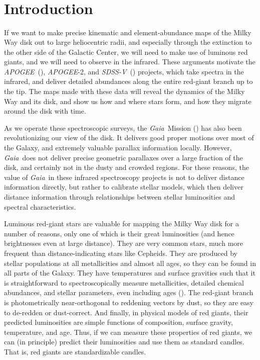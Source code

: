 \documentclass[modern]{aastex62}
\newcommand{\acronym}[1]{{\small{#1}}}
\newcommand{\project}[1]{\textsl{#1}}
\newcommand{\apogee}{\project{\acronym{APOGEE}}}
\newcommand{\gaia}{\project{Gaia}}
\newcommand{\sdssv}{\project{\acronym{SDSS-V}}}
\begin{document}

\section*{~}\clearpage
\section{Introduction} \label{sec:intro}

If we want to make precise kinematic and element-abundance maps
of the Milky Way disk out to large heliocentric radii,
and especially through the extinction to the other side of the Galactic Center, we will
need to make use of luminous red giants, and we will need to observe in
the infrared.
These arguments motivate the \apogee\ (\citealt{apogee}),
\apogee-2, and \sdssv\ (\citealt{sdssv})
projects, which take spectra in the infrared, and deliver detailed abundances
along the entire red-giant branch up to the tip.
The maps made with these data will reveal the dynamics of the Milky Way and its disk,
and show us how and where stars form, and how they migrate around the
disk with time.

As we operate these spectroscopic surveys,
the \gaia\ Mission (\citealt{gaia}) has also been revolutionizing our view of the disk.
It delivers good proper motions over most of the Galaxy,
and extremely valuable parallax information locally.
However, \gaia\ does not deliver precise geometric parallaxes over a large fraction of
the disk, and certainly not in the dusty and crowded regions.
For these reasons, the value of \gaia\ in these infrared spectroscopy projects is not
to deliver distance information directly, but rather to calibrate stellar models,
which then deliver distance information through relationships between stellar
luminosities and spectral characteristics.

Luminous red-giant stars are valuable for mapping the Milky Way disk for a number
of reasons, only one of which is their great luminosities (and hence brightnesses
even at large distance).
They are very common stars, much more frequent than distance-indicating
stars like Cepheids.
They are produced by stellar populations at all metallicities and almost all ages,
so they can be found in all parts of the Galaxy.
They have temperatures and surface gravities such that it is
straightforward to spectroscopically measure metallicities,
detailed chemical abundances, and stellar parameters, even including ages (\citealt{martig, nessage}).
The red-giant branch is photometrically near-orthogonal to reddening vectors by dust,
so they are easy to de-redden or dust-correct.
And finally, in physical models of red giants, their predicted luminosities are simple
functions of composition, surface gravity, temperature, and age.
Thus, if we can measure these properties of red giants, we can (in principle) predict
their luminosities and use them as standard candles.
That is, red giants are standardizable candles.
\end{document}
